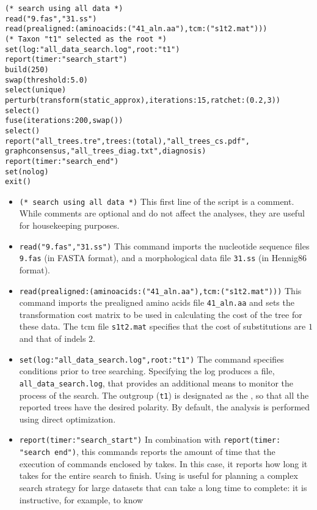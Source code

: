 \begin{verbatim}
(* search using all data *)
read("9.fas","31.ss")
read(prealigned:(aminoacids:("41_aln.aa"),tcm:("s1t2.mat")))
(* Taxon "t1" selected as the root *)
set(log:"all_data_search.log",root:"t1")
report(timer:"search_start")
build(250)
swap(threshold:5.0)
select(unique)
perturb(transform(static_approx),iterations:15,ratchet:(0.2,3))
select()
fuse(iterations:200,swap())
select()
report("all_trees.tre",trees:(total),"all_trees_cs.pdf",
graphconsensus,"all_trees_diag.txt",diagnosis)
report(timer:"search_end")
set(nolog)
exit()
\end{verbatim}

\begin{itemize}
\item \texttt{(* search using all data *)} This first line of the script is a comment. While comments are optional 
and do not affect the analyses, they are useful for housekeeping purposes.
\item \texttt{read("9.fas","31.ss")} This command imports the nucleotide sequence files \texttt{9.fas} (in FASTA 
format), and a morphological data file \texttt{31.ss} (in Hennig86 format).
\item \texttt{read(prealigned:(aminoacids:("41\_aln.aa"),tcm:("s1t2.mat")))} This command imports the prealigned
amino acids file \texttt{41\_aln.aa} and sets the transformation cost matrix to be used in calculating the cost of the tree
for these data.  The tcm file \texttt{s1t2.mat} specifies that the cost of substitutions are $1$ and that of indels $2$.
\item \texttt{set(log:"all\_data\_search.log",root:"t1")} The  command specifies 
conditions prior to tree searching. Specifying the log 
produces a file, \texttt{all\_data\_search.log}, that provides an additional means to monitor the process 
of the search. The outgroup (\texttt{t1}) is designated as the , so that all the 
reported trees have the desired polarity. By default, the analysis is performed using direct optimization.
\item \texttt{report(timer:"search\_start")} In combination with \texttt{report(timer:\\"search end")}, this commands 
reports the amount of time that the execution of commands enclosed by  takes. In this 
case, it reports how long it takes for the entire search to finish. Using  is useful for planning a complex 
search strategy for large datasets that can take a long time to complete: it is instructive, for example, to know 

\end{itemize}
